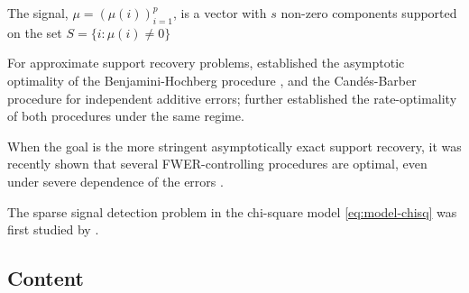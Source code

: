 The signal, $\mu = (\mu(i))_{i=1}^p$, is a vector with $s$ non-zero components supported on the set $S=\{i:\mu(i)\neq 0\}$


For approximate support recovery problems, \citet*{arias2017distribution} established the asymptotic optimality of the Benjamini-Hochberg procedure \cite{benjamini1995controlling}, and the Cand\'es-Barber procedure \cite{barber2015controlling} for independent additive errors;
\citet{rabinovich2017optimal} further established the rate-optimality of both procedures under the same regime.

When the goal is the more stringent asymptotically exact support recovery, it was recently shown that several FWER-controlling procedures are optimal, even under severe dependence of the errors \cite{gao2018fundamental}.

The sparse signal detection problem in the chi-square model \eqref{eq:model-chisq} was first studied by \cite{donoho2004higher}.


\cite{gao2019upass}



\subsection{Content}